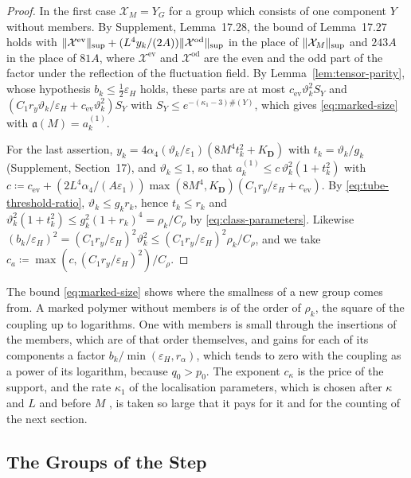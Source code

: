 \documentclass[11pt]{preprint}
\DeclarePairedDelimiter{\norm}{\lVert}{\rVert}
\numberwithin{equation}{section}
\theoremstyle{definition}
\theoremstyle{remark}
\theoremstyle{plain}
\begin{document}
\begin{proof}
In the first case $\mathcal X_M = Y_G$ for a group which consists of one component $Y$ without members. By Supplement, Lemma~17.28, the bound of Lemma~17.27 holds with $\norm{\mathcal X^{\mathrm{ev}}}_{\sup} + (L^4y_k/(2A))\norm{\mathcal X^{\mathrm{od}}}_{\sup}$ in the place of $\norm{\mathcal X_M}_{\sup}$ and $243A$ in the place of $81A$, where $\mathcal X^{\mathrm{ev}}$ and $\mathcal X^{\mathrm{od}}$ are the even and the odd part of the factor under the reflection of the fluctuation field. By Lemma~\ref{lem:tensor-parity}, whose hypothesis $b_k \leq \frac12\varepsilon_H$ holds, these parts are at most $c_{\mathrm{ev}}\vartheta_k^2S_Y$ and $(C_1r_y\vartheta_k/\varepsilon_H + c_{\mathrm{ev}}\vartheta_k^2)S_Y$ with $S_Y \leq e^{-(\kappa_1 - 3)\#(Y)}$, which gives \eqref{eq:marked-size} with $\mathfrak a(M) = a^{(1)}_k$.

For the last assertion, $y_k = 4\alpha_4(\vartheta_k/\varepsilon_1)(8M^4t_k^2 + K_{\mathbf D})$ with $t_k = \vartheta_k/g_k$ (Supplement, Section~17), and $\vartheta_k \leq 1$, so that $a^{(1)}_k \leq c\,\vartheta_k^2(1 + t_k^2)$ with $c \coloneqq c_{\mathrm{ev}} + (2L^4\alpha_4/(A\varepsilon_1))\max(8M^4, K_{\mathbf D})(C_1r_y/\varepsilon_H + c_{\mathrm{ev}})$. By \eqref{eq:tube-threshold-ratio}, $\vartheta_k \leq g_kr_k$, hence $t_k \leq r_k$ and $\vartheta_k^2(1 + t_k^2) \leq g_k^2(1 + r_k)^4 = \rho_k/C_\rho$ by \eqref{eq:class-parameters}. Likewise $(b_k/\varepsilon_H)^2 = (C_1r_y/\varepsilon_H)^2\vartheta_k^2 \leq (C_1r_y/\varepsilon_H)^2\rho_k/C_\rho$, and we take $c_a \coloneqq \max(c, (C_1r_y/\varepsilon_H)^2)/C_\rho$.
\end{proof}

The bound \eqref{eq:marked-size} shows where the smallness of a new group comes from. A marked polymer without members is of the order of $\rho_k$, the square of the coupling up to logarithms. One with members is small through the insertions of the members, which are of that order themselves, and gains for each of its components a factor $b_k/\min(\varepsilon_H, r_\alpha)$, which tends to zero with the coupling as a power of its logarithm, because $q_0 > p_0$. The exponent $c_\kappa$ is the price of the support, and the rate $\kappa_1$ of the localisation parameters, which is chosen after $\kappa$ and $L$ and before $M$ \cite[p.~5]{BalabanRG2}, is taken so large that it pays for it and for the counting of the next section.

\subsection{The Groups of the Step}\label{sec:groups-of-step}
\end{document}

